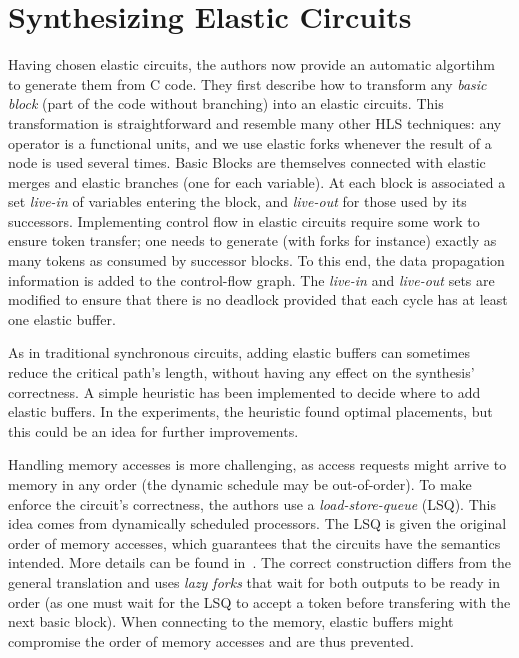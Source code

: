 \documentclass{article}
\begin{document}
\section{Synthesizing Elastic Circuits}
Having chosen elastic circuits, the authors now provide an automatic algortihm to generate them from C code.
They first describe how to transform any \textit{basic block} (part of the code without branching) into an elastic circuits. This transformation is straightforward and resemble many other HLS techniques: any operator is a functional units, and we use elastic forks whenever the result of a node is used several times.
Basic Blocks are themselves connected with elastic merges and elastic branches (one for each variable).
At each block is associated a set \textit{live-in} of variables entering the block, and \textit{live-out} for those used by its successors.
Implementing control flow in elastic circuits require some work to ensure token transfer; one needs to generate (with forks for instance) exactly as many tokens as consumed by successor blocks. To this end, the data propagation information is added to the control-flow graph. The \textit{live-in} and \textit{live-out} sets are modified to ensure that there is no deadlock provided that each cycle has at least one elastic buffer.

As in traditional synchronous circuits, adding elastic buffers can sometimes reduce the critical path's length, without having any effect on the synthesis' correctness. A simple heuristic has been implemented to decide where to add elastic buffers. In the experiments, the heuristic found optimal placements, but this could be an idea for further improvements.

Handling memory accesses is more challenging, as access requests might arrive to memory in any order (the dynamic schedule may be out-of-order).
To make enforce the circuit's correctness, the authors use a \textit{load-store-queue} (LSQ). This idea comes from dynamically scheduled processors. The LSQ is given the original order of memory accesses, which guarantees that the circuits have the semantics intended. More details can be found in~\cite{DBLP:journals/tecs/JosipovicBI17}. The correct construction differs from the general translation and uses \textit{lazy forks} that wait for both outputs to be ready in order (as one must wait for the LSQ to accept a token before transfering with the next basic block). When connecting to the memory, elastic buffers might compromise the order of memory accesses and are thus prevented.
\end{document}
